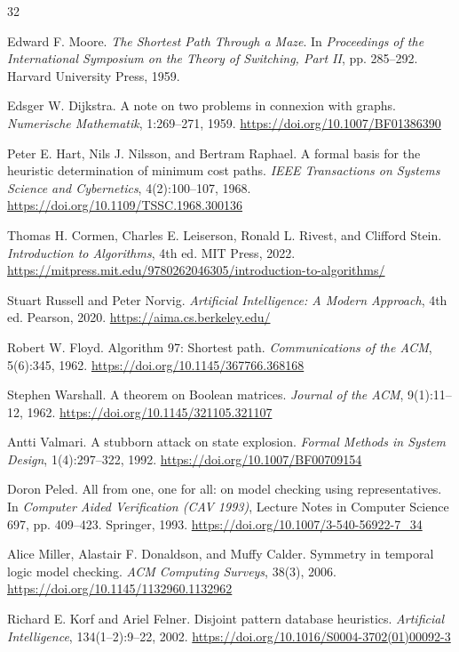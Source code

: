 \begin{thebibliography}{32}

Edward F. Moore.
\emph{The Shortest Path Through a Maze}.
In \emph{Proceedings of the International Symposium on the Theory of Switching, Part II}, pp. 285--292. Harvard University Press, 1959.

Edsger W. Dijkstra.
A note on two problems in connexion with graphs.
\emph{Numerische Mathematik}, 1:269--271, 1959.
\url{https://doi.org/10.1007/BF01386390}

Peter E. Hart, Nils J. Nilsson, and Bertram Raphael.
A formal basis for the heuristic determination of minimum cost paths.
\emph{IEEE Transactions on Systems Science and Cybernetics}, 4(2):100--107, 1968.
\url{https://doi.org/10.1109/TSSC.1968.300136}

Thomas H. Cormen, Charles E. Leiserson, Ronald L. Rivest, and Clifford Stein.
\emph{Introduction to Algorithms}, 4th ed.
MIT Press, 2022.
\url{https://mitpress.mit.edu/9780262046305/introduction-to-algorithms/}

Stuart Russell and Peter Norvig.
\emph{Artificial Intelligence: A Modern Approach}, 4th ed.
Pearson, 2020.
\url{https://aima.cs.berkeley.edu/}

Robert W. Floyd.
Algorithm 97: Shortest path.
\emph{Communications of the ACM}, 5(6):345, 1962.
\url{https://doi.org/10.1145/367766.368168}

Stephen Warshall.
A theorem on Boolean matrices.
\emph{Journal of the ACM}, 9(1):11--12, 1962.
\url{https://doi.org/10.1145/321105.321107}

Antti Valmari.
A stubborn attack on state explosion.
\emph{Formal Methods in System Design}, 1(4):297--322, 1992.
\url{https://doi.org/10.1007/BF00709154}

Doron Peled.
All from one, one for all: on model checking using representatives.
In \emph{Computer Aided Verification (CAV 1993)}, Lecture Notes in Computer Science 697, pp. 409--423. Springer, 1993.
\url{https://doi.org/10.1007/3-540-56922-7_34}

Alice Miller, Alastair F. Donaldson, and Muffy Calder.
Symmetry in temporal logic model checking.
\emph{ACM Computing Surveys}, 38(3), 2006.
\url{https://doi.org/10.1145/1132960.1132962}

Richard E. Korf and Ariel Felner.
Disjoint pattern database heuristics.
\emph{Artificial Intelligence}, 134(1--2):9--22, 2002.
\url{https://doi.org/10.1016/S0004-3702(01)00092-3}


\end{thebibliography}
